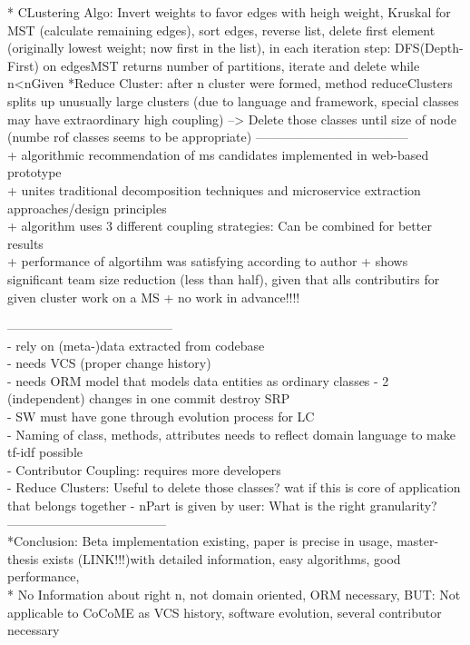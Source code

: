 * CLustering Algo: Invert weights to favor edges  with heigh weight, Kruskal for MST (calculate remaining edges), sort edges, reverse list, delete first element (originally lowest weight; now first in the list), in each iteration step: DFS(Depth-First) on edgesMST returns number of partitions, iterate and delete while n<nGiven
*Reduce Cluster: after n cluster were formed, method reduceClusters splits up unusually large clusters (due to language and framework, special classes may have extraordinary high coupling) --> Delete those classes until size of node (numbe rof classes seems to be appropriate)
------------------------------------\\


+ algorithmic recommendation of ms candidates implemented in web-based prototype\\
+ unites traditional decomposition techniques and microservice extraction approaches/design principles\\
+ algorithm uses 3 different coupling strategies: Can be combined for better results\\
+ performance of algortihm was satisfying according to author
+ shows significant team size reduction (less than half), given that alls contributirs for given cluster work on a MS
+ no work in advance!!!!

---------------------------------------\\


- rely on (meta-)data extracted from codebase\\
- needs VCS (proper change history)\\
- needs ORM model that models data entities as ordinary classes
- 2 (independent) changes in one commit destroy SRP\\
- SW must have gone through evolution process for LC\\
- Naming of class, methods, attributes needs to reflect domain language to make tf-idf possible\\
- Contributor Coupling: requires more developers\\
- Reduce Clusters: Useful to delete those classes? wat if this is core of application that belongs together
- nPart is given by user: What is the right granularity?\\

--------------------------------------\\
*Conclusion: Beta implementation existing, paper is precise in usage, master-thesis exists (LINK!!!)with detailed information, easy algorithms, good performance, \\
* No Information about right n, not domain oriented, ORM necessary,
BUT: Not applicable to CoCoME as VCS history, software evolution, several contributor necessary



